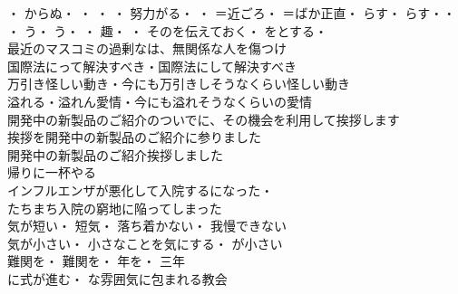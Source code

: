 
・
からぬ・
・
・
・
努力がる・
・
＝近ごろ・
＝ばか正直・
らす・
らす・・
・
う・
う・
・
趣・
・
そのを伝えておく・
をとする・
\\

最近のマスコミの過剰なは、無関係な人を傷つけ\\
国際法にって解決すべき・国際法にして解決すべき\\

万引き怪しい動き・今にも万引きしそうなくらい怪しい動き\\
溢れる・溢れん愛情・今にも溢れそうなくらいの愛情\\

開発中の新製品のご紹介のついでに、その機会を利用して挨拶します\\
挨拶を開発中の新製品のご紹介に参りました\\
開発中の新製品のご紹介挨拶しました\\
帰りに一杯やる\\

インフルエンザが悪化して入院するになった・\\
たちまち入院の窮地に陥ってしまった\\

気が短い・
短気・
落ち着かない・
我慢できない\\
気が小さい・
小さなことを気にする・
が小さい\\

難関を・
難関を・
年を・
三年\\

に式が進む・
な雰囲気に包まれる教会\\

